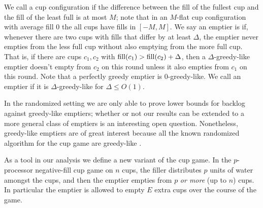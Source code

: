 We call a cup configuration  if the difference
between the fill of the fullest cup and the fill of the least
full is at most $M$; note that in an $M$-flat cup configuration with
average fill $0$ the all cups have fills in $[-M, M]$. We say an emptier is
 if, whenever there are two cups with
fills that differ by at least $\Delta$, the emptier never empties
from the less full cup without also emptying from the more full
cup. That is, if there are cups $c_1, c_2$ with $\operatorname{\textnormal{fill}}(c_1) >
\operatorname{\textnormal{fill}}(c_2) + \Delta$, then a $\Delta$-greedy-like emptier doesn't
empty from $c_2$ on this round unless it also empties from $c_1$
on this round. Note that a perfectly greedy emptier is
$0$-greedy-like. We call an emptier  if it is
$\Delta$-greedy-like for $\Delta \le O(1)$. 

In the randomized setting we are only able to prove lower bounds
for backlog against greedy-like emptiers; whether or not our
results can be extended to a more general class of emptiers is an
interesting open question. Nonetheless, greedy-like emptiers are
of great interest because all the known randomized algorithm for
the cup game are greedy-like \cite{mbe19, wku20}.

As a tool in our analysis we define a new variant of the cup
game. In the $p$-processor  negative-fill cup
game on $n$ cups, the filler distributes $p$ units of water
amongst the cups, and then the emptier empties from $p$
\textit{or more} (up to $n$) cups. In particular the emptier is
allowed to empty $E$ extra cups over the course of the game.

